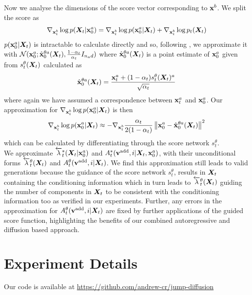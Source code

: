 Now we analyse the dimensions of the score vector corresponding to ${\mathbf{x}}^b$. We split the score as
\begin{equation}
    \nabla_{{\mathbf{x}}_t^b} \log p({\bm{X}}_t | {\mathbf{x}}_0^a) = \nabla_{{\mathbf{x}}_t^b} \log p({\mathbf{x}}_0^a | {\bm{X}}_t) + \nabla_{{\mathbf{x}}_t^b} \log p_t({\bm{X}}_t)
    \label{eq:condScoreSplit}
\end{equation}
$p({\mathbf{x}}_0^a | {\bm{X}}_t)$ is intractable to calculate directly and so, following \cite{ho2022video}, we approximate it with $\mathcal{N}({\mathbf{x}}_0^a ; \hat{{\mathbf{x}}}_0^{\theta a}({\bm{X}}_t), \frac{1 - \alpha_t}{\alpha_t} I_{n_a d})$ where $\hat{{\mathbf{x}}}_0^{\theta a}({\bm{X}}_t)$ is a point estimate of ${\mathbf{x}}_0^a$ given from $s_t^\theta({\bm{X}}_t)$ calculated as 
\begin{equation}
    \hat{{\mathbf{x}}}_0^{\theta a}({\bm{X}}_t) = \frac{{\mathbf{x}}_t^a + (1 - \alpha_t) s_t^\theta({\bm{X}}_t)^a}{\sqrt{\alpha_t}}
\end{equation}
where again we have assumed a correspondence between ${\mathbf{x}}_t^a$ and ${\mathbf{x}}_0^a$. Our approximation for $\nabla_{{\mathbf{x}}_t^b} \log p({\mathbf{x}}_0^a | {\bm{X}}_t)$ is then
\begin{equation}
    \nabla_{{\mathbf{x}}_t^b} \log p({\mathbf{x}}_0^a | {\bm{X}}_t) \approx - \nabla_{{\mathbf{x}}_t^b} \frac{\alpha_t}{2 ( 1- \alpha_t)} \left\lVert{\mathbf{x}}_0^a - \hat{{\mathbf{x}}}_0^{\theta a}({\bm{X}}_t) \right\rVert^2
\end{equation}
which can be calculated by differentiating through the score network $s_t^\theta$. \\

We approximate $\overleftarrow{\lambda}_t^*({\bm{X}}_t | {\mathbf{x}}_0^a)$ and $A_t^*({\mathbf{v}}^{\textup{add}}, i | {\bm{X}}_t, {\mathbf{x}}_0^a)$, with their unconditional forms $\overleftarrow{\lambda}_t^\theta({\bm{X}}_t)$ and $A_t^\theta({\mathbf{v}}^{\textup{add}}, i | {\bm{X}}_t)$. We find this approximation still leads to valid generations because the guidance of the score network $s_t^\theta$, results in ${\bm{X}}_t$ containing the conditioning information which in turn leads to $\overleftarrow{\lambda}_t^\theta({\bm{X}}_t)$ guiding the number of components in ${\bm{X}}_t$ to be consistent with the conditioning information too as verified in our experiments. Further, any errors in the approximation for $A_t^\theta({\mathbf{v}}^{\textup{add}}, i | {\bm{X}}_t)$ are fixed by further applications of the guided score function, highlighting the benefits of our combined autoregressive and diffusion based approach.







\section{Experiment Details}
\label{sec:tddm-ExperimentDetails}
Our code is available at \url{https://github.com/andrew-cr/jump-diffusion}

